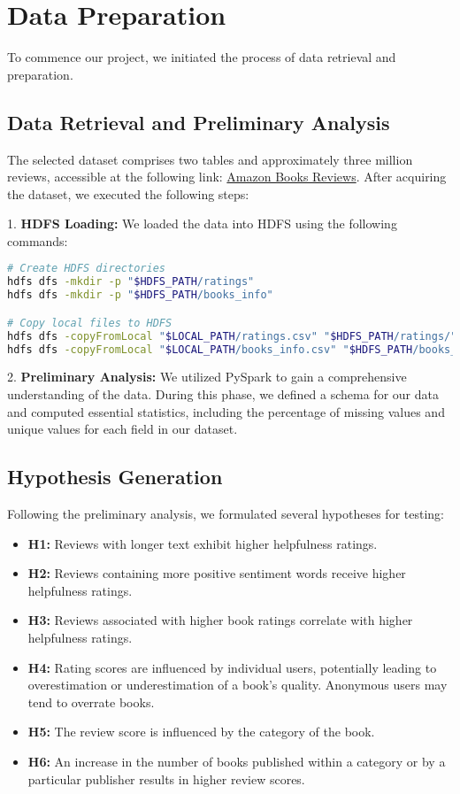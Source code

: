 \section{Data Preparation}
To commence our project, we initiated the process of data retrieval and preparation.

\subsection*{Data Retrieval and Preliminary Analysis}
The selected dataset comprises two tables and approximately three million reviews, accessible at the following link: \href{https://www.kaggle.com/datasets/mohamedbakhet/amazon-books-reviews}{Amazon Books Reviews}. After acquiring the dataset, we executed the following steps:

1. \textbf{HDFS Loading:} We loaded the data into HDFS using the following commands:

\begin{lstlisting}[language=bash, frame=single, basicstyle=\footnotesize\ttfamily, breaklines=true]
# Create HDFS directories
hdfs dfs -mkdir -p "$HDFS_PATH/ratings"
hdfs dfs -mkdir -p "$HDFS_PATH/books_info"

# Copy local files to HDFS
hdfs dfs -copyFromLocal "$LOCAL_PATH/ratings.csv" "$HDFS_PATH/ratings/"
hdfs dfs -copyFromLocal "$LOCAL_PATH/books_info.csv" "$HDFS_PATH/books_info/"
\end{lstlisting}

2. \textbf{Preliminary Analysis:} We utilized PySpark to gain a comprehensive understanding of the data. During this phase, we defined a schema for our data and computed essential statistics, including the percentage of missing values and unique values for each field in our dataset.

\subsection*{Hypothesis Generation}
Following the preliminary analysis, we formulated several hypotheses for testing:

\begin{itemize}[leftmargin=*, noitemsep]
    \item \textbf{H1:} Reviews with longer text exhibit higher helpfulness ratings.
    \item \textbf{H2:} Reviews containing more positive sentiment words receive higher helpfulness ratings.
    \item \textbf{H3:} Reviews associated with higher book ratings correlate with higher helpfulness ratings.
    \item \textbf{H4:} Rating scores are influenced by individual users, potentially leading to overestimation or underestimation of a book's quality. Anonymous users may tend to overrate books.
    \item \textbf{H5:} The review score is influenced by the category of the book.
    \item \textbf{H6:} An increase in the number of books published within a category or by a particular publisher results in higher review scores.
\end{itemize}

